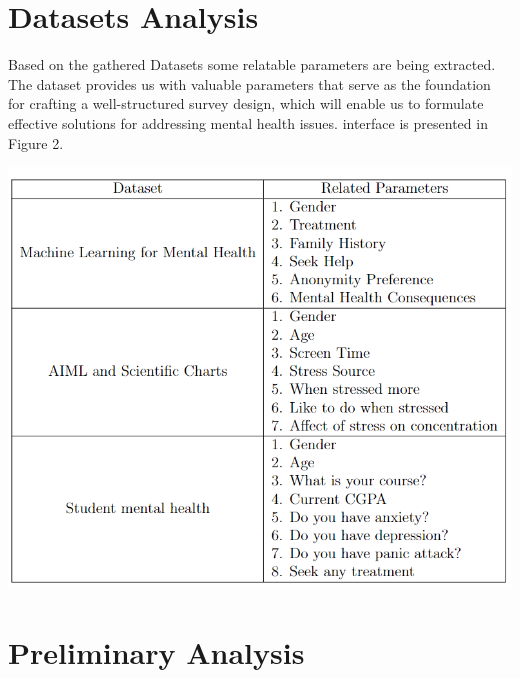 \documentclass[a0,landscape]{a0poster}
\begin{document}
\begin{multicols}{4}
\begin{center}
\end{center}







\section*{Datasets Analysis}

Based on the gathered Datasets some relatable parameters are being extracted. The dataset provides us with valuable parameters that serve as the foundation for crafting a well-structured survey design, which will enable us to formulate effective solutions for addressing mental health issues. interface is presented in Figure 2.
 


\begin{center}
\includegraphics[width=0.5\linewidth]{figures/table.png}
\end{center}

    





\section*{Preliminary Analysis}


\end{multicols}
\end{document}
